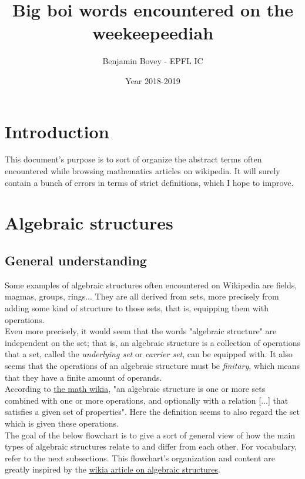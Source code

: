 \documentclass{article}
\title{Big boi words encountered on the weekeepeediah}
\author{Benjamin Bovey - EPFL IC}
\date{Year 2018-2019}
\begin{document}
\maketitle
\section*{Introduction}
This document's purpose is to sort of organize the abstract terms often encountered while browsing mathematics articles on wikipedia. It will surely contain a bunch of errors in terms of strict definitions, which I hope to improve.

\section{Algebraic structures}
\subsection{General understanding}
Some examples of algebraic structures often encountered on Wikipedia are fields, magmas, groups, rings... They are all derived from sets, more precisely from adding some kind of structure to those sets, that is, equipping them with operations. \\
Even more precisely, it would seem that the words "algebraic structure" are independent on the set; that is, an algebraic structure is a collection of operations that a set, called the \emph{underlying set} or \emph{carrier set}, can be equipped with. It also seems that the operations of an algebraic structure must be \emph{finitary}, which means that they have a finite amount of operands. \\
According to \href{http://math.wikia.com/wiki/Algebraic_structure}{the math wikia}, "an algebraic structure is one or more sets combined with one or more operations, and optionally with a relation [...] that satisfies a given set of properties". Here the definition seems to also regard the set which is given these operations. \\

The goal of the below flowchart is to give a sort of general view of how the main types of algebraic structures relate to and differ from each other. For vocabulary, refer to the next subsections. This flowchart's organization and content are greatly inspired by the \href{http://math.wikia.com/wiki/Algebraic_structure}{wikia article on algebraic structures}.
\end{document}

